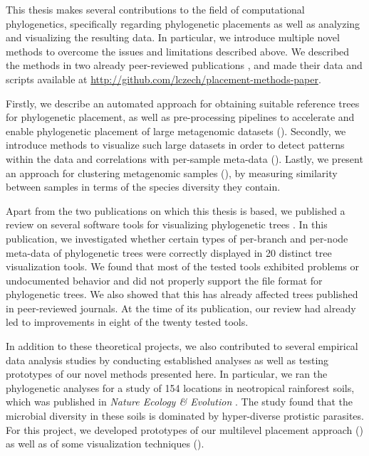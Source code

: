 
This thesis makes several contributions to the field of computational phylogenetics,
specifically regarding phylogenetic placements as well as analyzing and visualizing the resulting data.
In particular, we introduce multiple novel methods to overcome the issues and limitations described above.
We described the methods in two already peer-reviewed publications \cite{Czech2018-phat,Czech2019-analysis},
and made their data and scripts available at \url{http://github.com/lczech/placement-methods-paper}.


Firstly, we describe an automated approach for obtaining suitable reference trees for phylogenetic placement,
as well as pre-processing pipelines to accelerate and enable
phylogenetic placement of large metagenomic datasets ().
Secondly, we introduce methods to visualize such large datasets
in order to detect patterns within the data and correlations with per-sample meta-data ().
Lastly, we present an approach for clustering metagenomic samples (),
by measuring similarity between samples in terms of the species diversity they contain.

Apart from the two publications on which this thesis is based,
we published a review on several software tools for visualizing phylogenetic trees \cite{Czech2017-tree-viewers}.
In this publication, we investigated whether certain types of per-branch and per-node meta-data of phylogenetic trees
were correctly displayed in \num{20} distinct tree visualization tools.
We found that most of the tested tools exhibited problems or undocumented behavior and
did not properly support the  file format for phylogenetic trees.
We also showed that this has already affected trees published in peer-reviewed journals.
At the time of its publication, our review had already led to improvements in eight of the twenty tested tools.

In addition to these theoretical projects, we also contributed to several empirical data analysis studies
by conducting established analyses as well as testing prototypes of our novel methods presented here.
In particular, we ran the phylogenetic analyses for a study of \num{154} locations
in neotropical rainforest soils, which was published in \textit{Nature Ecology \& Evolution} \cite{Mahe2017}.
The study found that the microbial diversity in these soils is dominated by hyper-diverse protistic parasites.
For this project, we developed prototypes of our multilevel placement approach
()
as well as of some visualization techniques ().

